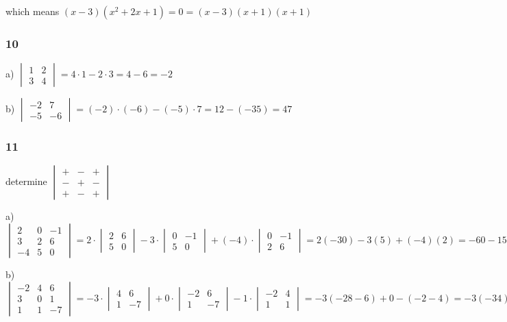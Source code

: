 \documentclass[]{report}
\begin{document}
which means $(x-3)(x^2 + 2x + 1) = 0 = (x-3)(x+1)(x+1)$

\subsubsection{10}
a) 
$
\begin{vmatrix}
	1 & 2\\
	3 & 4
\end{vmatrix} = 4\cdot1 - 2\cdot3 = 4 -6 = -2
$

b) 
$
\begin{vmatrix}
-2 & 7 \\
-5 & -6
\end{vmatrix} = (-2) \cdot (-6) - (-5)\cdot 7 = 12 - (-35) = 47
$

\subsubsection{11}
determine
$
\begin{vmatrix}
+ & - & + \\
- & + & - \\
+ & - & +
\end{vmatrix}
$

a) $
\begin{vmatrix}
2 & 0 & -1 \\
3 & 2 & 6 \\
-4 & 5 & 0
\end{vmatrix}=
 2 \cdot \begin{vmatrix}
2 & 6\\
5 & 0
\end{vmatrix}
- 3\cdot \begin{vmatrix}
0 & -1\\
5 & 0
\end{vmatrix}
+ (-4)\cdot \begin{vmatrix}
0 & -1 \\
2&6
\end{vmatrix}
=2(-30) - 3(5) + (-4)(2) = -60 -15  - 8 = -83
$


b)$
\begin{vmatrix}
-2 & 4 & 6 \\
3 & 0 & 1 \\
1 & 1 & -7
\end{vmatrix}= - 3\cdot \begin{vmatrix}
4 & 6 \\
1 & -7
\end{vmatrix}
+ 0 \cdot \begin{vmatrix}
-2 & 6\\
1 & -7
\end{vmatrix}
- 1\cdot \begin{vmatrix}
-2 & 4\\
1 & 1
\end{vmatrix}= - 3(-28 - 6) + 0 - (-2 -4) = - 3(-34) - (-6) = - (-102) - (-6) = 108
$
\end{document}
